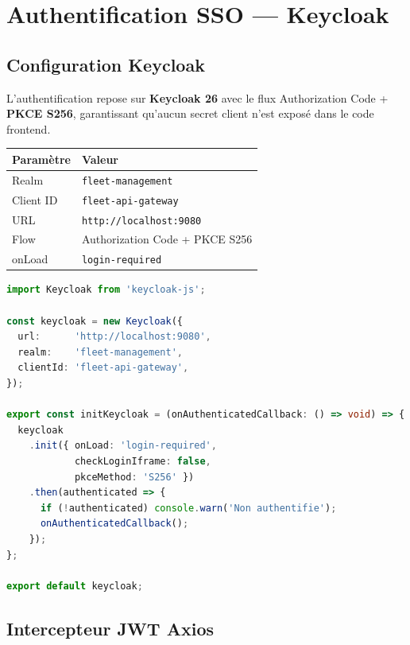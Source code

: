 \documentclass[12pt,a4paper]{report}
\begin{document}
\chapter{Authentification SSO — Keycloak}

\section{Configuration Keycloak}

L'authentification repose sur \textbf{Keycloak 26} avec le flux
Authorization Code + \textbf{PKCE S256}, garantissant qu'aucun secret client n'est
exposé dans le code frontend.

\begin{center}
\begin{tabular}{|l|l|}
  \hline
  \rowcolor{lightblue}
  \textbf{Paramètre} & \textbf{Valeur} \\
  \hline
  Realm     & \texttt{fleet-management} \\
  Client ID & \texttt{fleet-api-gateway} \\
  URL       & \texttt{http://localhost:9080} \\
  Flow      & Authorization Code + PKCE S256 \\
  onLoad    & \texttt{login-required} \\
  \hline
\end{tabular}
\end{center}

\begin{lstlisting}[style=code, language=TypeScript, caption=\texttt{src/auth.ts} — Initialisation Keycloak]
import Keycloak from 'keycloak-js';

const keycloak = new Keycloak({
  url:      'http://localhost:9080',
  realm:    'fleet-management',
  clientId: 'fleet-api-gateway',
});

export const initKeycloak = (onAuthenticatedCallback: () => void) => {
  keycloak
    .init({ onLoad: 'login-required',
            checkLoginIframe: false,
            pkceMethod: 'S256' })
    .then(authenticated => {
      if (!authenticated) console.warn('Non authentifie');
      onAuthenticatedCallback();
    });
};

export default keycloak;
\end{lstlisting}

\section{Intercepteur JWT Axios}
\end{document}
